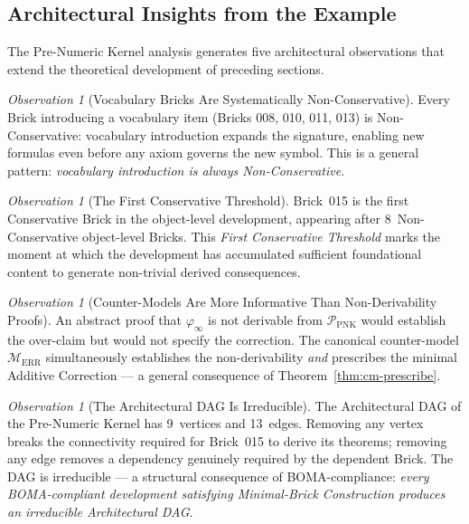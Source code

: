\documentclass[12pt, a4paper]{article}
\theoremstyle{plain}
\theoremstyle{definition}
\theoremstyle{remark}
\newtheorem{observation}[theorem]{Observation}
\newcommand{\BOMA}{\textsf{BOMA}}
\begin{document}
\subsection{Architectural Insights from the Example}
\label{subsec:ex-insights}

The Pre-Numeric Kernel analysis generates five architectural
observations that extend the theoretical development of preceding
sections.

\begin{observation}[Vocabulary Bricks Are Systematically
Non-Conservative]
Every Brick introducing a vocabulary item (Bricks 008, 010, 011, 013)
is Non-Conservative: vocabulary introduction expands the signature,
enabling new formulas even before any axiom governs the new symbol.
This is a general pattern: \emph{vocabulary introduction is always
Non-Conservative}.
\end{observation}

\begin{observation}[The First Conservative Threshold]
Brick~015 is the first Conservative Brick in the object-level
development, appearing after 8~Non-Conservative object-level Bricks.
This \emph{First Conservative Threshold} marks the moment at which
the development has accumulated sufficient foundational content to
generate non-trivial derived consequences.
\end{observation}

\begin{observation}[Counter-Models Are More Informative Than
Non-Derivability Proofs]
An abstract proof that $\varphi_\infty$ is not derivable from
$\mathcal{P}_{\mathrm{PNK}}$ would establish the over-claim but
would not specify the correction. The canonical counter-model
$\mathcal{M}_{\mathrm{ERR}}$ simultaneously establishes the
non-derivability \emph{and} prescribes the minimal Additive Correction
--- a general consequence of Theorem~\ref{thm:cm-prescribe}.
\end{observation}

\begin{observation}[The Architectural DAG Is Irreducible]
The Architectural DAG of the Pre-Numeric Kernel has 9~vertices and
13~edges. Removing any vertex breaks the connectivity required for
Brick~015 to derive its theorems; removing any edge removes a
dependency genuinely required by the dependent Brick. The DAG is
irreducible --- a structural consequence of \BOMA{}-compliance:
\emph{every \BOMA{}-compliant development satisfying Minimal-Brick
Construction produces an irreducible Architectural DAG}.
\end{observation}
\end{document}
